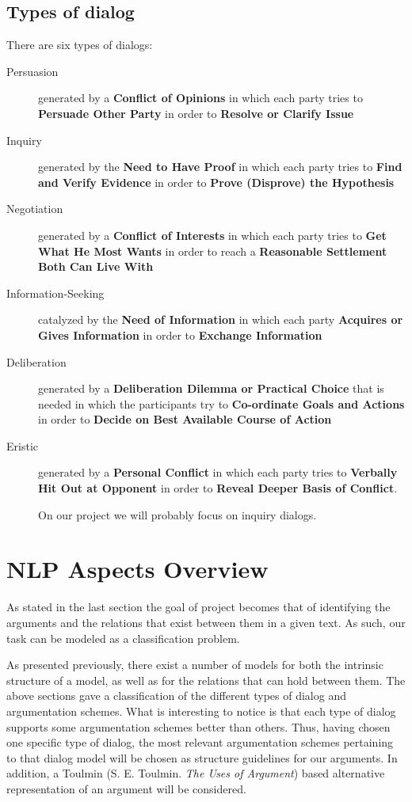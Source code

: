 \documentclass[lnbip]{svmultln}
\begin{document}
\subsection{Types of dialog}
There are six types of dialogs:
\begin{description}
\item[Persuasion] generated by a \textbf{Conflict of Opinions} in which each party tries to \textbf{Persuade Other Party} in order to \textbf{Resolve or Clarify Issue}
\item[Inquiry] generated by the \textbf{Need to Have Proof} in which each party tries to \textbf{Find and Verify Evidence} in order to \textbf{Prove (Disprove) the Hypothesis}
\item[Negotiation] generated by a \textbf{Conflict of Interests} in which each party tries to \textbf{Get What He Most Wants} in order to reach a \textbf{Reasonable Settlement Both Can Live With}
\item[Information-Seeking] catalyzed by the \textbf{Need of Information} in which each party \textbf{Acquires or Gives Information} in order to \textbf{Exchange Information}
\item[Deliberation] generated by a \textbf{Deliberation Dilemma or Practical Choice} that is needed in which the participants try to \textbf{Co-ordinate Goals and Actions} in order to \textbf{Decide on Best Available Course of Action}
\item[Eristic] generated by a \textbf{Personal Conflict} in which each party tries to \textbf{Verbally Hit Out at Opponent} in order to \textbf{Reveal Deeper Basis of Conflict}.
\par
On our project we will probably focus on inquiry dialogs.
\end{description}

\section{NLP Aspects Overview}
\par
As stated in the last section the goal of project becomes that of identifying the arguments and the relations that exist between them in a given text. 
As such, our task can be modeled as a classification problem.

\par
As presented previously, there exist a number of models for both the intrinsic structure of a model, as well as for the relations that can hold between them.
The above sections gave a classification of the different types of dialog and argumentation schemes. What is interesting to notice is that each type of dialog supports some argumentation schemes better than others. Thus, having chosen one specific type of dialog, the most relevant argumentation schemes pertaining to that dialog model will be chosen as structure guidelines for our arguments. 
In addition, a Toulmin (S. E. Toulmin. \textit{The Uses of Argument}) based alternative representation of an argument will be considered.
\end{document}
